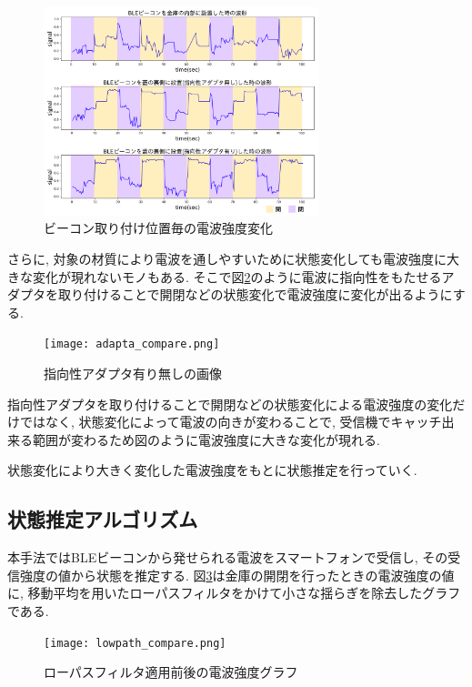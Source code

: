 \documentclass[Japanese]{dicomopapers}
\begin{document}
\begin{figure}[t]
 \centering
 \includegraphics[width=8cm]{in-out.png}
 \caption{ビーコン取り付け位置毎の電波強度変化}
 \label{transform-data}
\end{figure}

さらに, 対象の材質により電波を通しやすいために状態変化しても電波強度に大きな変化が現れないモノもある.
そこで図\ref{adapter}のように電波に指向性をもたせるアダプタを取り付けることで開閉などの状態変化で電波強度に変化が出るようにする.


\begin{figure}[ht]
 \centering
 \texttt{[image: adapta\_compare.png]}
 \caption{指向性アダプタ有り無しの画像}
 \label{adapter}
\end{figure}

指向性アダプタを取り付けることで開閉などの状態変化による電波強度の変化だけではなく, 状態変化によって電波の向きが変わることで, 受信機でキャッチ出来る範囲が変わるため図のように電波強度に大きな変化が現れる.

状態変化により大きく変化した電波強度をもとに状態推定を行っていく.

\subsection{状態推定アルゴリズム}
本手法ではBLEビーコンから発せられる電波をスマートフォンで受信し, その受信強度の値から状態を推定する.
図\ref{bank-opcl}は金庫の開閉を行ったときの電波強度の値に, 移動平均を用いたローパスフィルタをかけて小さな揺らぎを除去したグラフである.

\begin{figure}[t]
 \centering
 \texttt{[image: lowpath\_compare.png]}
 \caption{ローパスフィルタ適用前後の電波強度グラフ}
 \label{bank-opcl}
\end{figure}
\end{document}

